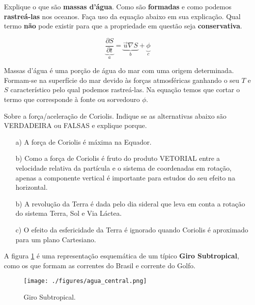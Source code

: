\documentclass[letterpaper,portuguese,12pt,pdftex]{exam}
\newcommand{\pd}[2]{\frac{\partial #1}{\partial #2}}
\begin{document}
\begin{questions}

\question[5]
Explique o que são {\bf massas d'água}.  Como são {\bf formadas} e como podemos
{\bf rastreá-las} nos oceanos.  Faça uso da equação abaixo em sua explicação.
Qual termo {\bf não} pode existir para que a propriedade em questão seja
{\bf conservativa}.

\[
  \underbrace{\pd{S}{t}}_a = \underbrace{\vec{u}\nabla S}_b + \underbrace{\phi}_c
\]

\begin{solution}
 Massas d'água é uma porção de água do mar com uma origem determinada.
 Formam-se na superfície do mar devido às forças atmosféricas ganhando o seu $T$
 e $S$ característico pelo qual podemos rastreá-las.  Na equação temos que
 cortar o termo que corresponde à fonte ou sorvedouro $\phi$.
\end{solution}


\question[3]
Sobre a força/aceleração de Coriolis.  Indique se as alternativas abaixo são
VERDADEIRA ou FALSAS e explique porque.
\begin{itemize}
  \item[a)] A força de Coriolis é máxima na Equador.
  \item[b)] Como a força de Coriolis é fruto do produto VETORIAL entre a velocidade
        relativa da partícula e o sistema de coordenadas em rotação, apenas a
        componente vertical é importante para estudos do seu efeito na
        horizontal.
  \item[b)] A revolução da Terra é dada pelo dia sideral que leva em conta a rotação
        do sistema Terra, Sol e Via Láctea.
  \item[c)] O efeito da esfericidade da Terra é ignorado quando Coriolis é
  aproximado para um plano Cartesiano.

\end{itemize}



\question
A figura \ref{fig:giro} é uma representação esquemática de um típico {\bf Giro
Subtropical}, como os que formam as correntes do Brasil e corrente do Golfo.


\begin{figure}[ht]
  \centering
  \texttt{[image: ./figures/agua\_central.png]}
  \caption{Giro Subtropical.}
  \label{fig:giro}
\end{figure}

\end{questions}
\end{document}

